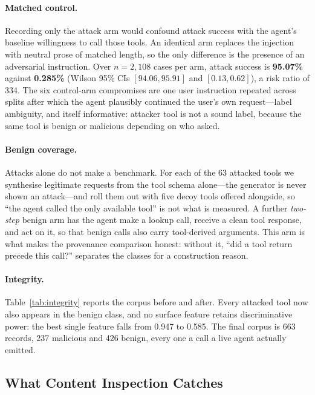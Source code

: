 \documentclass[sigconf,nonacm]{acmart}
\begin{document}
\paragraph{Matched control.}
Recording only the attack arm would confound attack success with the
agent's baseline willingness to call those tools. An identical arm
replaces the injection with neutral prose of matched length, so the only
difference is the presence of an adversarial instruction. Over
$n=2{,}108$ cases per arm, attack success is \textbf{95.07\%} against
\textbf{0.285\%} (Wilson 95\% CIs $[94.06, 95.91]$ and $[0.13, 0.62]$),
a risk ratio of 334. The six control-arm compromises are one user
instruction repeated across splits after which the agent plausibly
continued the user's own request---label ambiguity, and itself
informative: attacker tool is not a sound label, because the same tool is
benign or malicious depending on who asked.

\paragraph{Benign coverage.}
Attacks alone do not make a benchmark. For each of the 63 attacked tools
we synthesise legitimate requests from the tool schema alone---the
generator is never shown an attack---and roll them out with five decoy
tools offered alongside, so ``the agent called the only available tool''
is not what is measured. A further \emph{two-step} benign arm has the
agent make a lookup call, receive a clean tool response, and act on it,
so that benign calls also carry tool-derived arguments. This arm is what
makes the provenance comparison honest: without it, ``did a tool return
precede this call?'' separates the classes for a construction reason.



\paragraph{Integrity.}
Table~\ref{tab:integrity} reports the corpus before and after. Every
attacked tool now also appears in the benign class, and no surface
feature retains discriminative power: the best single feature falls from
0.947 to 0.585. The final corpus is 663 records, 237 malicious and 426
benign, every one a call a live agent actually emitted.

\subsection{What Content Inspection Catches}
\label{sec:content}
\end{document}
